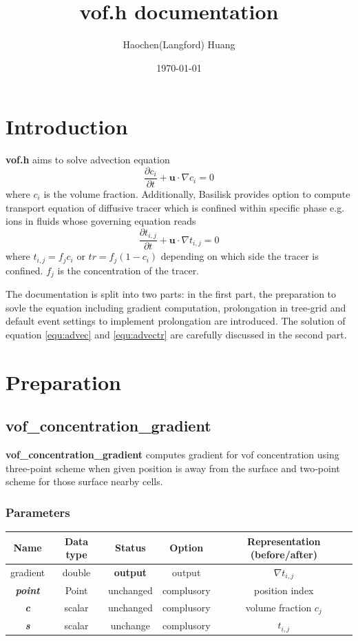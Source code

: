 \documentclass[a4paper]{article}
\title{vof.h documentation}
\author{Haochen(Langford) Huang}
\date{\today}
\newcommand{\func}[1]{\textbf{\textcolor{function}{#1}}}
\newcommand{\para}[1]{\textbf{\emph{\textcolor{para}{#1}}}}
\begin{document}
\maketitle
\section{Introduction}
\textbf{vof.h} aims to solve advection equation
\begin{equation}\label{equ:advec}
    \frac{\partial c_{i}}{\partial t} + \mathbf{u}\cdot\nabla c_{i} = 0
\end{equation}
where $c_{i}$ is the volume fraction.
Additionally, Basilisk provides option to compute transport equation of diffusive tracer which is confined within specific phase e.g. ions in fluids whose governing equation reads\cite{2015_Lopez}
\begin{equation}\label{equ:advectr}
    \frac{\partial t_{i,j}}{\partial t} + \mathbf{u}\cdot\nabla t_{i,j} = 0
\end{equation}
where $t_{i,j}=f_{j} c_{i}$ or $tr=f_{j} (1-c_{i})$ depending on which side the tracer is confined. $f_{j}$ is the concentration of the tracer.\par
The documentation is split into two parts: in the first part, the preparation to sovle the equation including gradient computation, prolongation in tree-grid and default event settings to implement prolongation are introduced. The solution of equation \ref{equ:advec} and \ref{equ:advectr} are carefully discussed in the second part.

\section{Preparation}
\subsection{\func{vof\_concentration\_gradient}}\label{sec:gradient}
\func{vof\_concentration\_gradient} computes gradient for vof concentration using three-point scheme when given position is away from the surface and two-point scheme for those surface nearby cells.
\subsubsection{Parameters}
\begin{table}[h]
  \centering
  \begin{tabular}{|c|c|c|c|c|}
    \hline
    Name & Data type & Status & Option & Representation (before/after)\\[0.5ex]
    \hline\hline
    \rowcolor{output} gradient & double & \textbf{output} & output & $\nabla t_{i,j}$\\
    \hline
    \para{point} & Point & unchanged & complusory & position index\\
    \hline
    \para{c} & scalar & unchanged & complusory & volume fraction $c_{j}$\\
    \hline
    \para{s} & scalar & unchange & complusory & $t_{i,j}$\\
    \hline
  \end{tabular}
\end{table}
\end{document}
